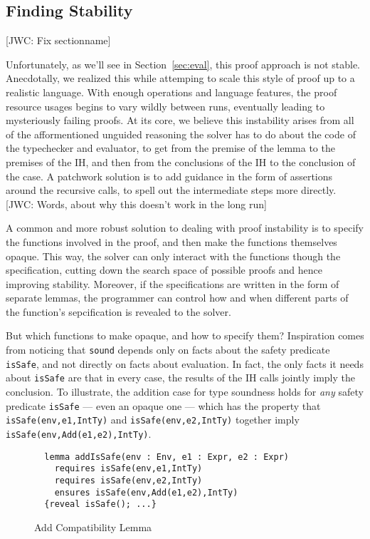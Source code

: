 \documentclass[sigplan,review,screen,anonymous]{acmart}
\newcommand{\comm}[3]{\textcolor{#1}{[#2: #3]}}
\newcommand{\jwc}[1]{\comm{dkgreen}{JWC}{#1}}
\begin{document}
\subsection*{Finding Stability}
\jwc{Fix sectionname}

Unfortunately, as we'll see in Section~\ref{sec:eval}, this proof approach is
not stable. Anecdotally, we realized this while attemping to scale this style
of proof up to a realistic language. With enough operations and language
features, the proof resource usages begins to vary wildly between runs,
eventually leading to mysteriously failing proofs. At its core, we believe this
instability arises from all of the afformentioned unguided reasoning the solver has to do about the
code of the typechecker and evaluator,
to get from the premise of the lemma to the premises of the IH, and then
from the conclusions of the IH to the conclusion of the case.
A patchwork solution is to add guidance in the form of assertions around the
recursive calls, to spell out the intermediate steps more directly.
\jwc{Words, about why this doesn't work in the long run}

A common and more robust solution to dealing with proof instability is to specify
the functions involved in the proof, and then make the functions themselves opaque.
This way, the solver can only interact with the functions though the specification,
cutting down the search space of possible proofs and hence improving stability.
Moreover, if the specifications are written in the form of separate lemmas,
the programmer can control how and when different parts of the function's sepcification
is revealed to the solver.

But which functions to make opaque, and how to specify them?
Inspiration comes from noticing that \texttt{sound} depends only on
facts about the safety predicate \texttt{isSafe}, and not directly
on facts about evaluation. In fact, the only facts it needs about \texttt{isSafe}
are that in every case, the results of the IH calls jointly imply the conclusion.
To illustrate, the addition case for type soundness holds
for \emph{any} safety predicate \texttt{isSafe} --- even an opaque one --- which has the property
that \texttt{isSafe(env,e1,IntTy)} and \texttt{isSafe(env,e2,IntTy)}
together imply \texttt{isSafe(env,Add(e1,e2),IntTy)}.


\begin{figure}
  \begin{verbatim}
  lemma addIsSafe(env : Env, e1 : Expr, e2 : Expr)
    requires isSafe(env,e1,IntTy)
    requires isSafe(env,e2,IntTy)
    ensures isSafe(env,Add(e1,e2),IntTy)
  {reveal isSafe(); ...}
  \end{verbatim}
  \caption{Add Compatibility Lemma}
  \label{fig:add-is-safe}
\end{figure}
\end{document}
